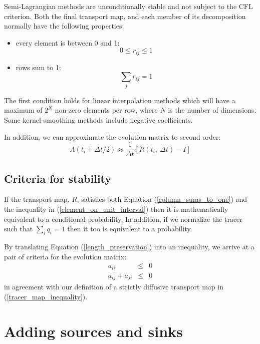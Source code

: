 \documentclass[11pt]{article}
\begin{document}
Semi-Lagrangian methods are unconditionally stable and not subject to the
CFL criterion.
Both the final transport map, and each member of its decomposition normally have
the following properties:
\begin{itemize}
\item every element is between 0 and 1:
\begin{equation}
0 \le r_{ij} \le 1
\label{element_on_unit_interval}
\end{equation}
\item rows sum to 1:
\begin{equation}
\sum_j r_{ij} = 1
\end{equation}
\end{itemize}
The first condition holds for linear interpolation methods which will have
a maximum of $2^N$ non-zero elements per row, 
where $N$ is the number of dimensions. 
Some kernel-smoothing methods include negative coefficients.

In addition, we can approximate the evolution matrix to second order:
\begin{equation}
A(t_i+\Delta t/2) \approx \frac{1}{\Delta t} \left [R(t_i,~\Delta t) - I \right ]
\end{equation}

\subsection{Criteria for stability}

If the transport map, $R$, satisfies both Equation (\ref{column_sums_to_one})
and the inequality in (\ref{element_on_unit_interval}) then it is mathematically
equivalent to a conditional probability.
In addition, if we normalize the tracer such that $\sum_i q_i=1$
then it too is equivalent to a probability.

By translating Equation (\ref{length_preservation}) into an inequality, 
we arrive at a pair of criteria for the evolution matrix:
\begin{eqnarray}
a_{ii} & \le & 0 \\
a_{ij}+a_{ji} & \le & 0
\end{eqnarray}
in agreement with our definition of a strictly diffusive transport map in
(\ref{tracer_map_inequality}). 


\section{Adding sources and sinks}
\end{document}
